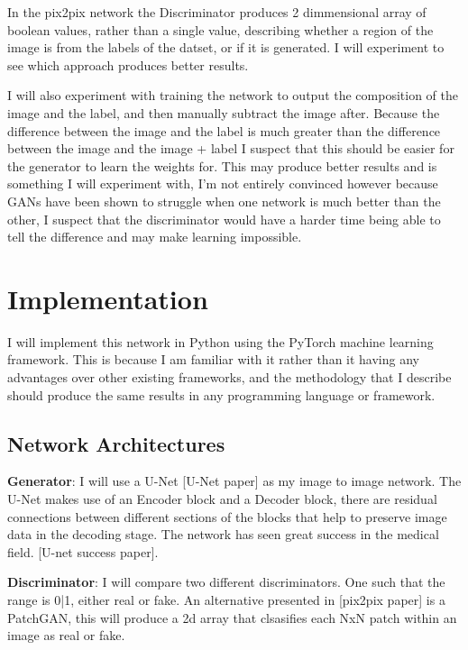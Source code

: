 \documentclass{UoYCSproject}
\begin{document}
In the pix2pix network the Discriminator produces 2 dimmensional array of boolean values, rather than a single value, describing whether a region of the image is from the labels of the datset, or if it is generated. I will experiment to see which approach produces better results. 


I will also experiment with training the network to output the composition of the image and the label, and then manually subtract the image after. Because the difference between the image and the label is much greater than the difference between the image and the image + label I suspect that this should be easier for the generator to learn the weights for. This may produce better results and is something I will experiment with, I'm not entirely convinced however because GANs have been shown to struggle when one network is much better than the other, I suspect that the discriminator would have a harder time being able to tell the difference and may make learning impossible. 

\section{Implementation}

I will implement this network in Python using the PyTorch machine learning framework. This is because I am familiar with it rather than it having any advantages over other existing frameworks, and the methodology that I describe should produce the same results in any programming language or framework.

\subsection{Network Architectures}

\textbf{Generator}: I will use a U-Net [U-Net paper] as my image to image network. The U-Net makes use of an Encoder block and a Decoder block, there are residual connections between different sections of the blocks that help to preserve image data in the decoding stage. The network has seen great success in the medical field. [U-net success paper].

\textbf{Discriminator}: I will compare two different discriminators. One such that the range is {0|1}, either real or fake. An alternative presented in [pix2pix paper] is a PatchGAN, this will produce a 2d array that clsasifies each NxN patch within an image as real or fake.
\end{document}
